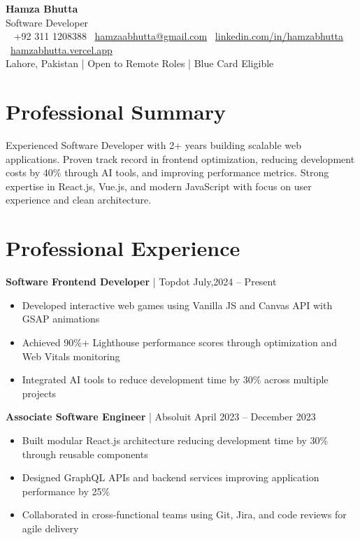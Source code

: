 \documentclass[10pt]{article}
\makeatletter
\newcommand{\headerfontsize}{\Large}
\newcommand{\bodyfontsize}{\small}
\newcommand{\resumeHeader}[1]{
    \begin{center}
        {\headerfontsize\bfseries\color{headercolor} Hamza Bhutta} \\[2pt]
        {\normalsize\color{headercolor} Software Developer} \\[4pt]
        {\bodyfontsize\color{headercolor}
            \faPhone~ +92 311 1208388 \quad
            \faEnvelope~\href{mailto:hamzaabhutta@gmail.com}{hamzaabhutta@gmail.com} \quad
            \faLinkedin~\href{https://www.linkedin.com/in/hamzabhutta}{linkedin.com/in/hamzabhutta} \quad
            \faGlobe~\href{https://hamzabhutta.vercel.app/}{hamzabhutta.vercel.app}
        } \\[3pt]
        {\bodyfontsize\color{headercolor} Lahore, Pakistan | Open to Remote Roles | Blue Card Eligible}
        \vspace{6pt}
    \end{center}
}
\makeatother
\begin{document}
\pagestyle{empty}

\resumeHeader{}

\section{Professional Summary}
\bodyfontsize
Experienced Software Developer with 2+ years building scalable web applications. Proven track record in frontend optimization, reducing development costs by 40\% through AI tools, and improving performance metrics. Strong expertise in React.js, Vue.js, and modern JavaScript with focus on user experience and clean architecture.

\section{Professional Experience}

\textbf{Software Frontend Developer} | Topdot \hfill July,2024 -- Present
\begin{itemize}
\item Developed interactive web games using Vanilla JS and Canvas API with GSAP animations
\item Achieved 90\%+ Lighthouse performance scores through optimization and Web Vitals monitoring
\item Integrated AI tools to reduce development time by 30\% across multiple projects
\end{itemize}
\textbf{Associate Software Engineer} | Absoluit \hfill April 2023 – December 2023
\begin{itemize}
\item Built modular React.js architecture reducing development time by 30\% through reusable components
\item Designed GraphQL APIs and backend services improving application performance by 25\%
\item Collaborated in cross-functional teams using Git, Jira, and code reviews for agile delivery
\end{itemize}

\end{document}
